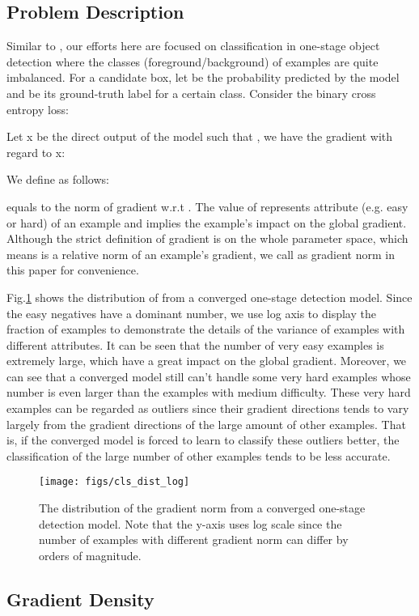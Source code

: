 \documentclass[letterpaper]{article} \usepackage{aaai19}  \usepackage{times}  \usepackage{helvet}  \usepackage{courier}  \usepackage{url}  \usepackage{graphicx}  \usepackage{amsmath,amssymb}
\begin{document}
\subsection{Problem Description}
Similar to \cite{focal}, our efforts here are focused on classification in one-stage object detection where the classes (foreground/background) of examples are quite imbalanced. For a candidate box, let  be the probability predicted by the model and  be its ground-truth label for a certain class. Consider the binary cross entropy loss: 

Let x be the direct output of the model such that , we have the gradient with regard to x:

We define  as follows:

 equals to the norm of gradient w.r.t . The value of  represents attribute (e.g. easy or hard) of an example and implies the example's impact on the global gradient. Although the strict definition of gradient is on the whole parameter space, which means  is a relative norm of an example's gradient, we call  as gradient norm in this paper for convenience.

Fig.\ref{fig:cls_dist_log} shows the distribution of  from a converged one-stage detection model. Since the easy negatives have a dominant number, we use log axis to display the fraction of examples to demonstrate the details of the variance of examples with different attributes. It can be seen that the number of very easy examples is extremely large, which have a great impact on the global gradient. Moreover, we can see that a converged model still can't handle some very hard examples whose number is even larger than the examples with medium difficulty. These very hard examples can be regarded as outliers since their gradient directions tends to vary largely from the gradient directions of the large amount of other examples. That is, if the converged model is forced to learn to classify these outliers better, the classification of the large number of other examples tends to be less accurate.
\begin{figure}[ht]
\centering
\texttt{[image: figs/cls\_dist\_log]}
\caption{The distribution of the gradient norm  from a converged one-stage detection model. Note that the y-axis uses log scale since the number of examples with different gradient norm can differ by orders of magnitude.}
\label{fig:cls_dist_log}
\end{figure}

\subsection{Gradient Density}
\end{document}
